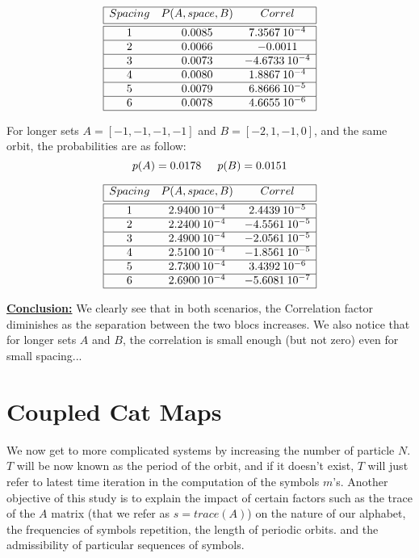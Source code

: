 \begin{description}
{   \[
\begin{array}{|c c c|}
\hline
Spacing & P(A,space,B) & Correl \\ [0.5ex]
\hline \hline
1 & 0.0085 & 7.3567\:10^{-4} \\
\hline
2 & 0.0066 & -0.0011\\
\hline
3 & 0.0073 & -4.6733\:10^{-4}\\
\hline
4 & 0.0080 & 1.8867\:10^{-4}\\
\hline
5 & 0.0079 & 6.8666\:10^{-5}\\
\hline
6 & 0.0078 & 4.6655\:10^{-6}\\
\hline
\end{array}
\]


  For longer sets $A = [-1,-1,-1,-1]$ and $B = [-2,1,-1,0]$, and the same orbit, the probabilities are as follow:
\[
   p(A) = 0.0178 \hskip 0.2in p(B) = 0.0151
   \]

\[
\begin{array}{|c c c|}
\hline
Spacing & P(A,space,B) & Correl \\ [0.5ex]
\hline \hline
1 & 2.9400\:10^{-4} & 2.4439\:10^{-5}\\
\hline
2 & 2.2400\:10^{-4} & -4.5561\:10^{-5}\\
\hline
3 & 2.4900\:10^{-4} & -2.0561\:10^{-5}\\
\hline
4 & 2.5100\:10^{-4} & -1.8561\:10^{-5}\\
\hline
5 & 2.7300\:10^{-4} & 3.4392\:10^{-6}\\
\hline
6 & 2.6900\:10^{-4} & -5.6081\:10^{-7}\\
\hline
\end{array}
\]

\underline{\textbf{Conclusion:}} \: We clearly see that in both scenarios, the Correlation factor diminishes as the separation between the two blocs increases.  We also notice that for longer sets $A$ and $B$, the correlation is small enough (but not zero) even for small spacing...

}

\end{description}


\section{Coupled Cat Maps}

We now get to more complicated systems by increasing the number of particle $N$. $T$ will be now known as the period of the orbit, and if it doesn't exist, $T$ will just refer to latest time iteration in the computation of the symbols $m$'s. Another objective of this study is to explain the impact of certain factors such as the trace of the $A$ matrix (that we refer as $s = trace(A)$) on the nature of our alphabet, the frequencies of symbols repetition, the length of periodic orbits. and the admissibility of particular sequences of symbols.

